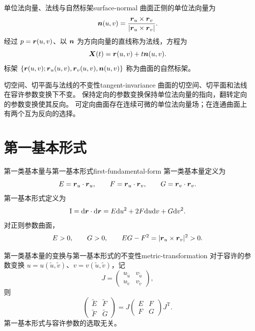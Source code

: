 \begin{definition}{单位法向量、法线与自然标架}{surface-normal}
曲面正侧的单位法向量为
\[
\boldsymbol{n}(u,v)=\frac{\boldsymbol{r}_u\times\boldsymbol{r}_v}{|\boldsymbol{r}_u\times\boldsymbol{r}_v|}.
\]
经过 $p=\boldsymbol{r}(u,v)$、以 $\boldsymbol{n}$ 为方向向量的直线称为法线，方程为
\[
\boldsymbol{X}(t)=\boldsymbol{r}(u,v)+t\boldsymbol{n}(u,v).
\]
标架 $\{\boldsymbol{r}(u,v);\boldsymbol{r}_u(u,v),\boldsymbol{r}_v(u,v),\boldsymbol{n}(u,v)\}$
称为曲面的自然标架。
\end{definition}

\begin{proposition}{切空间、切平面与法线的不变性}{tangent-invariance}
曲面的切空间、切平面和法线在容许参数变换下不变。
保持定向的参数变换保持单位法向量的指向，翻转定向的参数变换使其反向。
可定向曲面存在连续可微的单位法向量场；在连通曲面上有两个互为反向的选择。
\end{proposition}

\section{第一基本形式}

\begin{definition}{第一类基本量与第一基本形式}{first-fundamental-form}
第一类基本量定义为
\[
E=\boldsymbol{r}_u\cdot\boldsymbol{r}_u,\qquad
F=\boldsymbol{r}_u\cdot\boldsymbol{r}_v,\qquad
G=\boldsymbol{r}_v\cdot\boldsymbol{r}_v.
\]
第一基本形式定义为
\[
\mathrm I=\mathrm{d}\boldsymbol{r}\cdot\mathrm{d}\boldsymbol{r}
=E\mathrm{d} u^2+2F\mathrm{d} u\mathrm{d} v+G\mathrm{d} v^2.
\]
对正则参数曲面，
\[
E>0,\qquad G>0,\qquad EG-F^2=|\boldsymbol{r}_u\times\boldsymbol{r}_v|^2>0.
\]
\end{definition}

\begin{proposition}{第一类基本量的变换与第一基本形式的不变性}{metric-transformation}
对于容许的参数变换 $u=u(\tilde u,\tilde v)$、$v=v(\tilde u,\tilde v)$，记
\[
J=\begin{pmatrix}u_{\tilde u}&v_{\tilde u}\\u_{\tilde v}&v_{\tilde v}\end{pmatrix},
\]
则
\[
\begin{pmatrix}\tilde E&\tilde F\\\tilde F&\tilde G\end{pmatrix}
=J\begin{pmatrix}E&F\\F&G\end{pmatrix}J^{\mathrm T}.
\]
第一基本形式与容许参数的选取无关。
\end{proposition}

